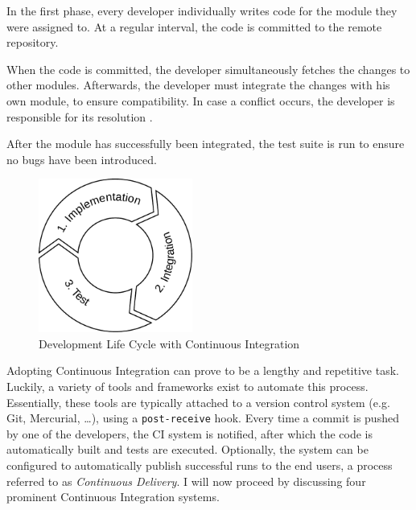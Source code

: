 \begin{enumerate}
	 In the first phase, every developer individually writes code for the module they were assigned to. At a regular interval, the code is committed to the remote repository.
	
	 When the code is committed, the developer simultaneously fetches the changes to other modules. Afterwards, the developer must integrate the changes with his own module, to ensure compatibility. In case a conflict occurs, the developer is responsible for its resolution \cite{martin2014}.
	
	 After the module has successfully been integrated, the test suite is run to ensure no bugs have been introduced.
\end{enumerate}

\begin{figure}[htbp!]
	\centering
	\includegraphics[width=0.45\textwidth]{assets/ci-lifecycle.pdf}
	\caption{Development Life Cycle with Continuous Integration}
	\label{fig:agile-ci-lifecycle}
\end{figure}

\noindent Adopting Continuous Integration can prove to be a lengthy and repetitive task. Luckily, a variety of tools and frameworks exist to automate this process. Essentially, these tools are typically attached to a version control system (e.g. Git, Mercurial, \dots), using a \texttt{post-receive} hook. Every time a commit is pushed by one of the developers, the CI system is notified, after which the code is automatically built and tests are executed. Optionally, the system can be configured to automatically publish successful runs to the end users, a process referred to as \emph{Continuous Delivery}. I will now proceed by discussing four prominent Continuous Integration systems.




